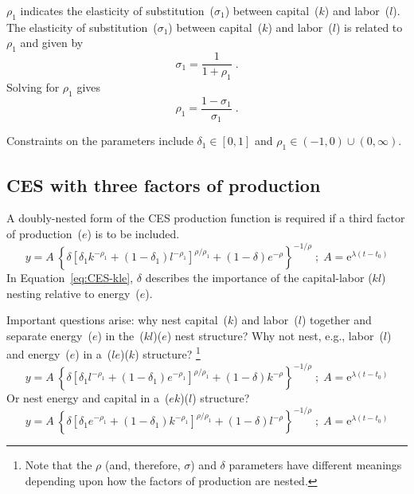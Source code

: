 \documentclass[preprint,authoryear,12pt]{elsarticle}
\begin{document}
$\rho_1$ indicates the elasticity 
of substitution~($\sigma_1$) between capital~($k$) and labor~($l$).
The elasticity of substitution~($\sigma_1$)
between capital~($k$) and labor~($l$) is related to $\rho_1$ and given by 
%
\begin{equation} \label{eq:sigma_1}
 \sigma_1 = \frac{1}{1+\rho_1} \; .
\end{equation}
%
Solving for $\rho_1$ gives
%
\begin{equation} \label{eq:rho_1}
  \rho_1 = \frac{1 - \sigma_1}{\sigma_1} \; .
\end{equation}

Constraints on the parameters include 
$\delta_1 \in [0,1]$ and
$\rho_1 \in (-1,0) \cup (0,\infty)$.



\subsection{CES with three factors of production} 
\label{sec:CES-3}

A doubly-nested form of the CES production function is required
if a third factor of production~($e$) is to be included.
%
\begin{equation} \label{eq:CES-kle}
  y = A \: \left\{\delta \left[\delta_1 k^{-\rho_1} 
      + (1-\delta_1)l^{-\rho_1} \right]^{\rho/\rho_1} 
      + (1-\delta) e^{-\rho} \right\}^{-1/\rho} \; ; \; 
      A = \mathrm{e}^{\lambda (t-t_0)}
\end{equation}
%
In Equation~\ref{eq:CES-kle}, $\delta$ 
describes the importance of the capital-labor ($kl$) nesting 
relative to energy~($e$).

Important questions arise: why nest capital~($k$) and labor~($l$) together 
and separate energy~($e$)
in the~($kl$)($e$) nest structure?
Why not nest, e.g., labor~($l$) and energy~($e$) in a~($le$)($k$) structure?%
  \footnote{
  Note that the $\rho$ (and, therefore, $\sigma$) and $\delta$ parameters have different
  meanings depending upon how the factors of production are nested.
  }%
%
\begin{equation} \label{eq:CES-lek}
  y = A \: \left\{\delta \left[\delta_1 l^{-\rho_1} 
      + (1-\delta_1) e^{-\rho_1} \right]^{\rho/\rho_1} 
      + (1-\delta) k^{-\rho} \right\}^{-1/\rho} \; ; \; 
      A = \mathrm{e}^{\lambda (t-t_0)}
\end{equation}
%
Or nest energy and capital in a~($ek$)($l$) structure?
%
\begin{equation} \label{eq:CES-ekl}
  y = A \: \left\{\delta \left[\delta_1 e^{-\rho_1} 
      + (1-\delta_1) k^{-\rho_1} \right]^{\rho/\rho_1} 
      + (1-\delta) l^{-\rho} \right\}^{-1/\rho} \; ; \; 
      A = \mathrm{e}^{\lambda (t-t_0)}
\end{equation}
\end{document}
